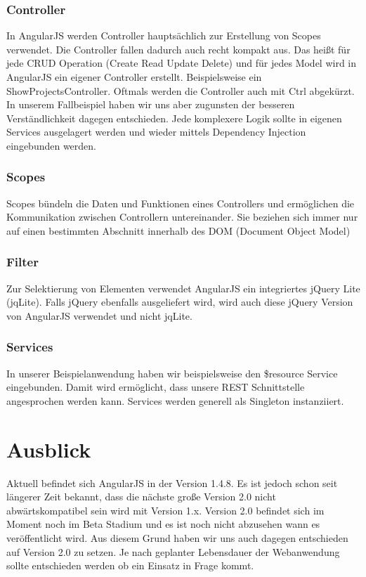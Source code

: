 \subsubsection{Controller}
In AngularJS werden Controller hauptsächlich zur Erstellung von Scopes verwendet.
Die Controller fallen dadurch auch recht kompakt aus.
Das heißt für jede CRUD Operation (Create Read Update Delete) und für jedes Model wird in AngularJS ein eigener Controller erstellt.
Beispielsweise ein ShowProjectsController.
Oftmals werden die Controller auch mit Ctrl abgekürzt.
In unserem Fallbeispiel haben wir uns aber zugunsten der besseren Verständlichkeit dagegen entschieden.
Jede komplexere Logik sollte in eigenen Services ausgelagert werden und wieder mittels Dependency Injection eingebunden werden. 

\subsubsection{Scopes}
Scopes bündeln die Daten und Funktionen eines Controllers und ermöglichen die Kommunikation zwischen Controllern untereinander.
Sie beziehen sich immer nur auf einen bestimmten Abschnitt innerhalb des DOM (Document Object Model)

\subsubsection{Filter}
Zur Selektierung von Elementen verwendet AngularJS ein integriertes jQuery Lite (jqLite).
Falls jQuery ebenfalls ausgeliefert wird, wird auch diese jQuery Version von AngularJS verwendet und nicht jqLite.

\subsubsection{Services}
In unserer Beispielanwendung haben wir beispielsweise den \$resource Service eingebunden.
Damit wird ermöglicht, dass unsere REST Schnittstelle angesprochen werden kann.
Services werden generell als Singleton instanziiert.

\section{Ausblick}
Aktuell befindet sich AngularJS in der Version 1.4.8.
Es ist jedoch schon seit längerer Zeit bekannt, dass die nächste große Version 2.0 nicht abwärtskompatibel sein wird mit Version 1.x.
Version 2.0 befindet sich im Moment noch im Beta Stadium und es ist noch nicht abzusehen wann es veröffentlicht wird.
Aus diesem Grund haben wir uns auch dagegen entschieden auf Version 2.0 zu setzen.
Je nach geplanter Lebensdauer der Webanwendung sollte entschieden werden ob ein Einsatz in Frage kommt.